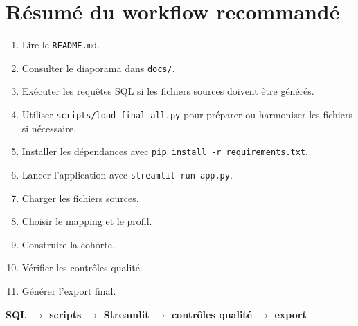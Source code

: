 \documentclass[11pt,a4paper]{article}
\newcommand{\code}[1]{\texttt{#1}}
\begin{document}
\section{Résumé du workflow recommandé}

\begin{enumerate}
  \item Lire le \code{README.md}.
  \item Consulter le diaporama dans \code{docs/}.
  \item Exécuter les requêtes SQL si les fichiers sources doivent être générés.
  \item Utiliser \code{scripts/load\_final\_all.py} pour préparer ou harmoniser les fichiers si nécessaire.
  \item Installer les dépendances avec \code{pip install -r requirements.txt}.
  \item Lancer l'application avec \code{streamlit run app.py}.
  \item Charger les fichiers sources.
  \item Choisir le mapping et le profil.
  \item Construire la cohorte.
  \item Vérifier les contrôles qualité.
  \item Générer l'export final.
\end{enumerate}

\begin{center}
\textbf{SQL $\rightarrow$ scripts $\rightarrow$ Streamlit $\rightarrow$ contrôles qualité $\rightarrow$ export}
\end{center}
\end{document}
